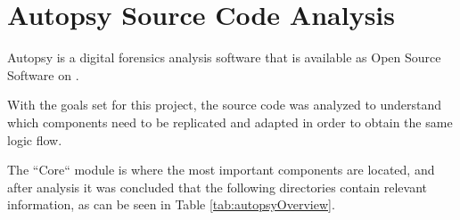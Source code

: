\section{Autopsy Source Code Analysis}

Autopsy is a digital forensics analysis software that is available as Open Source Software \cite{opensource} on  \cite{github}.

With the goals set for this project, the source code was analyzed to understand which components need to be replicated and adapted in order to obtain the same logic flow.

The ``Core`` module is where the most important components are located, and after analysis it was concluded that the following directories contain relevant information, as can be seen in Table \ref{tab:autopsyOverview}.

